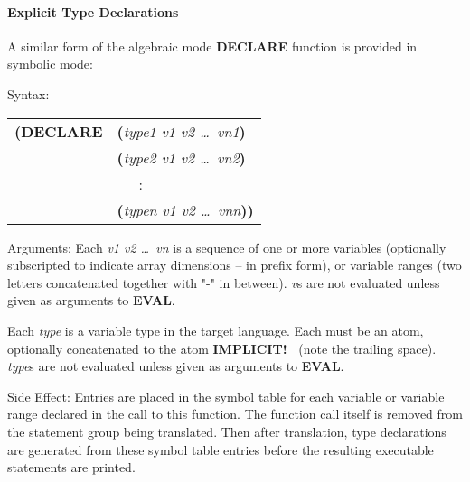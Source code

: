 \paragraph{Explicit Type Declarations}
A similar form of the algebraic mode {\bf DECLARE} function is provided in
symbolic mode:
\begin{describe}{Syntax:} 
\begin{tabular}{ll}
{\bf (DECLARE} & {\bf (}{\it type1 v1 v2 \dots\  vn1\/}{\bf )}\\
& {\bf (}{\it type2 v1 v2 \dots\  vn2\/}{\bf )}\\
& \ \ \ :\\
& {\bf (}{\it typen v1 v2 \dots\  vnn\/}{\bf )) }\\
\end{tabular}
\end{describe} 
\begin{describe}{Arguments:}
Each {\it v1 v2 \dots\ vn\/} is a sequence of one or more variables
(optionally subscripted to indicate array dimensions -- in prefix form), or
variable ranges (two letters concatenated together with "-" in between). {\it
v\/}s are not evaluated unless given as arguments to {\bf EVAL}.

Each {\it type\/} is a variable type in the target language.  Each
must be an atom, optionally concatenated to the atom {\bf IMPLICIT!\ }
(note the trailing space).  
{\it type\/}s are not evaluated unless given as arguments to {\bf EVAL}.
\end{describe} 
\begin{describe}{Side Effect:}
Entries are placed in the symbol table for each variable or
variable range declared in the call to this function.  The
function call itself is removed from the statement group
being translated.  Then after translation, type declarations are
generated from these symbol table entries before the resulting
executable statements are printed.
\end{describe}
